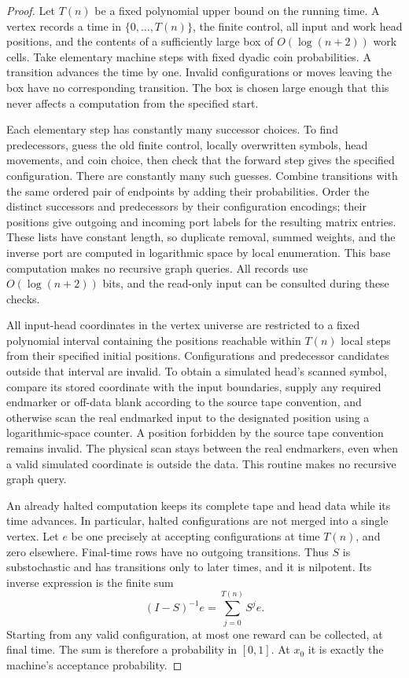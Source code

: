\begin{proof}
Let $T(n)$ be a fixed polynomial upper bound on the running time.
A vertex records a time in $\{0,\ldots,T(n)\}$, the finite control,
all input and work head positions, and the contents of a sufficiently
large box of $O(\log(n+2))$ work cells. Take elementary machine steps
with fixed dyadic coin probabilities. A transition advances the time
by one. Invalid configurations or moves leaving the box have no
corresponding transition. The box is chosen large enough that this
never affects a computation from the specified start.

Each elementary step has constantly many successor choices.
To find predecessors, guess the old finite control, locally overwritten
symbols, head movements, and coin choice, then check that the forward
step gives the specified configuration. There are constantly many such
guesses. Combine transitions with the same ordered pair of endpoints
by adding their probabilities. Order the distinct successors and
predecessors by their configuration encodings; their positions give
outgoing and incoming port labels for the resulting matrix entries. These lists have
constant length, so duplicate removal, summed weights, and the inverse
port are computed in logarithmic space by local enumeration. This
base computation makes no recursive graph queries. All records use
$O(\log(n+2))$ bits, and the read-only input can be consulted during
these checks.

All input-head coordinates in the vertex universe are restricted to a
fixed polynomial interval containing the positions reachable within
$T(n)$ local steps from their specified initial positions. Configurations
and predecessor candidates outside that interval are invalid. To obtain
a simulated head's scanned symbol, compare its stored coordinate with
the input boundaries, supply any required endmarker or off-data blank
according to the source tape convention, and otherwise scan the real
endmarked input to the designated position using a logarithmic-space
counter. A position forbidden by the source tape convention remains
invalid. The physical scan stays between the real endmarkers, even when
a valid simulated coordinate is outside the data. This routine makes
no recursive graph query.

An already halted computation keeps its complete tape and head data
while its time advances. In particular, halted configurations are not
merged into a single vertex. Let $e$ be one precisely at accepting
configurations at time $T(n)$, and zero elsewhere. Final-time rows
have no outgoing transitions. Thus $S$ is substochastic and has transitions only to later times, and it is nilpotent. Its inverse expression is the finite
sum
\[
(I-S)^{-1}e=\sum_{j=0}^{T(n)}S^je.
\]
Starting from any valid configuration, at most one reward can be
collected, at final time. The sum is therefore a probability in
$[0,1]$. At $x_0$ it is exactly the machine's acceptance probability.
\end{proof}

